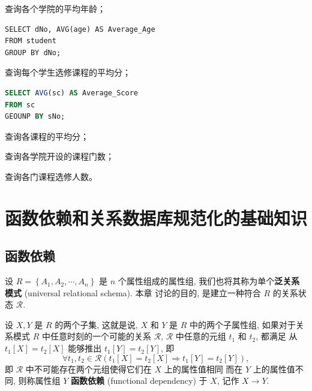 \documentclass[10pt,UTF8]{book} %
\begin{document}
\begin{example}
    查询各个学院的平均年龄；
    \begin{lstlisting}
SELECT dNo, AVG(age) AS Average_Age
FROM student
GROUP BY dNo;
    \end{lstlisting}
\end{example}

\begin{example}
    查询每个学生选修课程的平均分；
    \begin{lstlisting}[language=SQL]
SELECT AVG(sc) AS Average_Score
FROM sc
GEOUNP BY sNo;
    \end{lstlisting}
\end{example}
\begin{example}
    查询各课程的平均分；
\end{example}
\begin{example}
    查询各学院开设的课程门数；
\end{example}
\begin{example}
    查询各门课程选修人数。
\end{example}

\newpage
\thispagestyle{empty}

\chapter{函数依赖和关系数据库规范化的基础知识}

\section{函数依赖}

设 $R = \left\{ A_1, A_2, \cdots, A_n \right\}$ 是 $n$ 个属性组成的属性组,
我们也将其称为单个\textbf{泛关系模式} (universal relational schema). 本章
讨论的目的, 是建立一种符合 $R$ 的关系状态 $\mathcal{R}$.

\begin{definition}
    设 $X, Y$ 是 $R$ 的两个子集, 这就是说, $X$ 和 $Y$ 是 $R$ 中的两个子属性组,
    如果对于关系模式 $R$ 中任意时刻的一个可能的关系 $\mathcal{R}$,
    {\kaishu $\mathcal{R}$ 中任意的元组 $t_1$ 和 $t_2$, 都满足
    从 $t_1[X] = t_2[X]$ 能够推出 $t_1[Y] = t_2[Y]$}, 即
    \[ \forall t_1, t_2 \in \mathcal{R} \left(
        t_1[X] = t_2[X] \Rightarrow t_1[Y] = t_2[Y]
    \right), \]
    即 $\mathcal{R}$ 中不可能存在两个元组使得它们在 $X$ 上的属性值相同
    而在 $Y$ 上的属性值不同,
    则称属性组 $Y$ \textbf{函数依赖} (functional dependency) 于 $X$,
    记作 $X \to Y$.
\end{definition}
\end{document}
